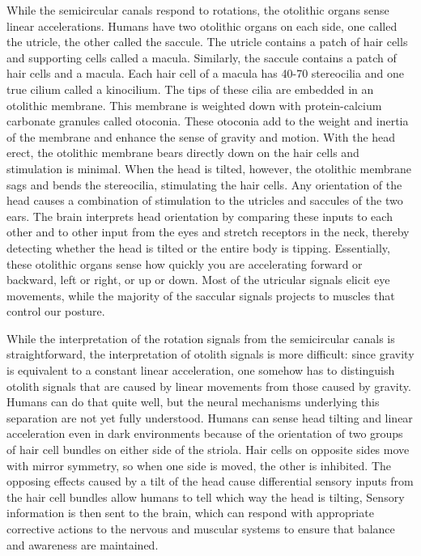 \documentclass[]{book}
\begin{document}
While the semicircular canals respond to rotations, the otolithic organs sense linear accelerations. Humans have two otolithic organs on each side, one called the utricle, the other called the saccule. The utricle contains a patch of hair cells and supporting cells called a macula. Similarly, the saccule contains a patch of hair cells and a macula. Each hair cell of a macula has 40-70 stereocilia and one true cilium called a kinocilium. The tips of these cilia are embedded in an otolithic membrane. This membrane is weighted down with protein-calcium carbonate granules called otoconia. These otoconia add to the weight and inertia of the membrane and enhance the sense of gravity and motion. With the head erect, the otolithic membrane bears directly down on the hair cells and stimulation is minimal. When the head is tilted, however, the otolithic membrane sags and bends the stereocilia, stimulating the hair cells. Any orientation of the head causes a combination of stimulation to the utricles and saccules of the two ears. The brain interprets head orientation by comparing these inputs to each other and to other input from the eyes and stretch receptors in the neck, thereby detecting whether the head is tilted or the entire body is tipping. Essentially, these otolithic organs sense how quickly you are accelerating forward or backward, left or right, or up or down. Most of the utricular signals elicit eye movements, while the majority of the saccular signals projects to muscles that control our posture.

While the interpretation of the rotation signals from the semicircular canals is straightforward, the interpretation of otolith signals is more difficult: since gravity is equivalent to a constant linear acceleration, one somehow has to distinguish otolith signals that are caused by linear movements from those caused by gravity. Humans can do that quite well, but the neural mechanisms underlying this separation are not yet fully understood. Humans can sense head tilting and linear acceleration even in dark environments because of the orientation of two groups of hair cell bundles on either side of the striola. Hair cells on opposite sides move with mirror symmetry, so when one side is moved, the other is inhibited. The opposing effects caused by a tilt of the head cause differential sensory inputs from the hair cell bundles allow humans to tell which way the head is tilting, Sensory information is then sent to the brain, which can respond with appropriate corrective actions to the nervous and muscular systems to ensure that balance and awareness are maintained.
\end{document}
